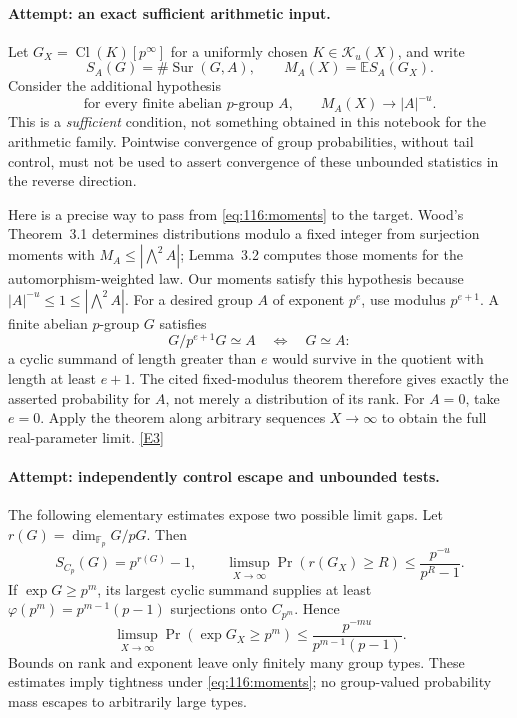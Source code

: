 \documentclass[11pt,a4paper]{article}
\newcommand{\F}{\mathbb{F}}
\newcommand{\E}{\mathbb{E}}
\newcommand{\eref}[2]{\hyperlink{extra:#1:#2}{[E#2]}}
\numberwithin{equation}{section}
\begin{document}
\paragraph{Attempt: an exact sufficient arithmetic input.}
Let $G_X=\operatorname{Cl}(K)[p^\infty]$ for a uniformly chosen
$K\in\mathcal K_u(X)$, and write
\[
 S_A(G)=\#\operatorname{Sur}(G,A),\qquad
 M_A(X)=\E S_A(G_X).
\]
Consider the additional hypothesis
\begin{equation}\label{eq:116:moments}
 \text{for every finite abelian $p$-group $A$,}\qquad
 M_A(X)\longrightarrow |A|^{-u}.
\end{equation}
This is a \emph{sufficient} condition, not something obtained in this
notebook for the arithmetic family. Pointwise convergence of group
probabilities, without tail control, must not be used to assert convergence
of these unbounded statistics in the reverse direction.

Here is a precise way to pass from \eqref{eq:116:moments} to the target.
Wood's Theorem~3.1 determines distributions modulo a fixed integer from
surjection moments with $M_A\leq|\bigwedge^2 A|$; Lemma~3.2 computes
those moments for the automorphism-weighted law. Our moments satisfy this
hypothesis because $|A|^{-u}\leq1\leq|\bigwedge^2 A|$.
For a desired group $A$ of exponent $p^e$, use modulus $p^{e+1}$.
A finite abelian $p$-group $G$ satisfies
\[
 G/p^{e+1}G\simeq A\quad\Longleftrightarrow\quad G\simeq A:
\]
a cyclic summand of length greater than $e$ would survive in the quotient
with length at least $e+1$. The cited fixed-modulus theorem therefore
gives exactly the asserted probability for $A$, not merely a distribution
of its rank. For $A=0$, take $e=0$. Apply the theorem along arbitrary
sequences $X\to\infty$ to obtain the full real-parameter limit.
\eref{116}{3}

\paragraph{Attempt: independently control escape and unbounded tests.}
The following elementary estimates expose two possible limit gaps.
Let $r(G)=\dim_{\F_p}G/pG$. Then
\[
 S_{C_p}(G)=p^{r(G)}-1,
 \qquad
 \limsup_{X\to\infty}\Pr(r(G_X)\geq R)
 \leq\frac{p^{-u}}{p^R-1}.
\]
If $\exp G\geq p^m$, its largest cyclic summand supplies at least
$\varphi(p^m)=p^{m-1}(p-1)$ surjections onto $C_{p^m}$. Hence
\begin{equation}\label{eq:116:tail}
 \limsup_{X\to\infty}\Pr(\exp G_X\geq p^m)
 \leq\frac{p^{-mu}}{p^{m-1}(p-1)}.
\end{equation}
Bounds on rank and exponent leave only finitely many group types. These
estimates imply tightness under \eqref{eq:116:moments}; no group-valued
probability mass escapes to arbitrarily large types.
\end{document}
